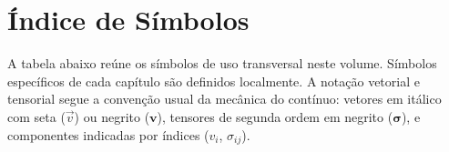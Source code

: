 \documentclass[12pt,a4paper]{article}
\numberwithin{equation}{section}
\numberwithin{table}{section}
\numberwithin{figure}{section}
\begin{document}
\clearpage
\section*{Índice de Símbolos}

A tabela abaixo reúne os símbolos de uso transversal neste volume. Símbolos
específicos de cada capítulo são definidos localmente. A notação vetorial e
tensorial segue a convenção usual da mecânica do contínuo: vetores em
itálico com seta ($\vec{v}$) ou negrito ($\mathbf{v}$), tensores de segunda
ordem em negrito ($\boldsymbol{\sigma}$), e componentes indicadas por
índices ($v_i$, $\sigma_{ij}$).

{\small
\setlength{\tabcolsep}{3pt}
\renewcommand{\arraystretch}{1.15}

}
\end{document}
